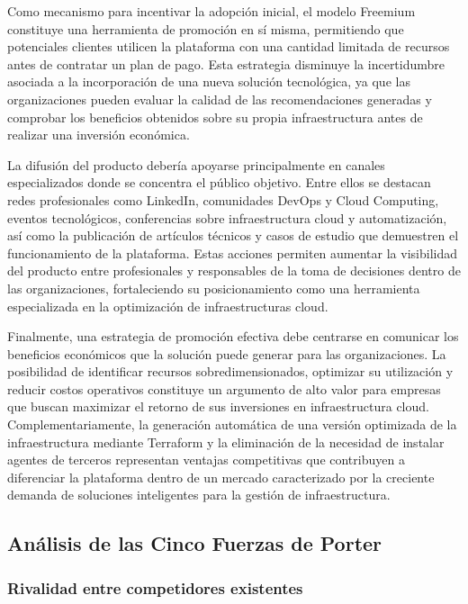 Como mecanismo para incentivar la adopción inicial, el modelo Freemium constituye una herramienta de promoción en sí misma, permitiendo que potenciales clientes utilicen la plataforma con una cantidad limitada de recursos antes de contratar un plan de pago. Esta estrategia disminuye la incertidumbre asociada a la incorporación de una nueva solución tecnológica, ya que las organizaciones pueden evaluar la calidad de las recomendaciones generadas y comprobar los beneficios obtenidos sobre su propia infraestructura antes de realizar una inversión económica.

La difusión del producto debería apoyarse principalmente en canales especializados donde se concentra el público objetivo. Entre ellos se destacan redes profesionales como LinkedIn, comunidades DevOps y Cloud Computing, eventos tecnológicos, conferencias sobre infraestructura cloud y automatización, así como la publicación de artículos técnicos y casos de estudio que demuestren el funcionamiento de la plataforma. Estas acciones permiten aumentar la visibilidad del producto entre profesionales y responsables de la toma de decisiones dentro de las organizaciones, fortaleciendo su posicionamiento como una herramienta especializada en la optimización de infraestructuras cloud.

Finalmente, una estrategia de promoción efectiva debe centrarse en comunicar los beneficios económicos que la solución puede generar para las organizaciones. La posibilidad de identificar recursos sobredimensionados, optimizar su utilización y reducir costos operativos constituye un argumento de alto valor para empresas que buscan maximizar el retorno de sus inversiones en infraestructura cloud. Complementariamente, la generación automática de una versión optimizada de la infraestructura mediante Terraform y la eliminación de la necesidad de instalar agentes de terceros representan ventajas competitivas que contribuyen a diferenciar la plataforma dentro de un mercado caracterizado por la creciente demanda de soluciones inteligentes para la gestión de infraestructura.

\subsection{Análisis de las Cinco Fuerzas de Porter}

\subsubsection{Rivalidad entre competidores existentes}

